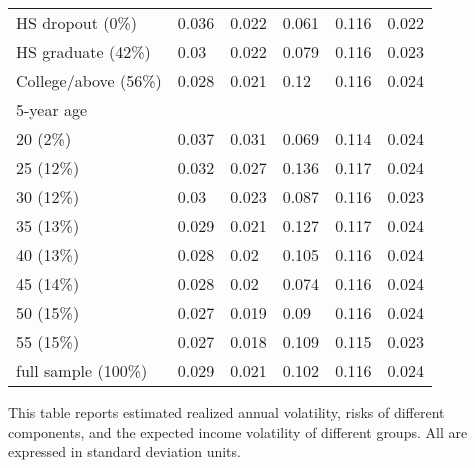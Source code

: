 \begin{table}
{\begin{tabular}{llllll}
HS dropout (0\%)     & 0.036         & 0.022                 & 0.061                   & 0.116         & 0.022        \\
HS graduate (42\%)   & 0.03          & 0.022                 & 0.079                   & 0.116         & 0.023        \\
College/above (56\%) & 0.028         & 0.021                 & 0.12                    & 0.116         & 0.024        \\
\hline 
5-year age           &               &                       &                         &               &              \\
\hline  
20 (2\%)             & 0.037         & 0.031                 & 0.069                   & 0.114         & 0.024        \\
25 (12\%)            & 0.032         & 0.027                 & 0.136                   & 0.117         & 0.024        \\
30 (12\%)            & 0.03          & 0.023                 & 0.087                   & 0.116         & 0.023        \\
35 (13\%)            & 0.029         & 0.021                 & 0.127                   & 0.117         & 0.024        \\
40 (13\%)            & 0.028         & 0.02                  & 0.105                   & 0.116         & 0.024        \\
45 (14\%)            & 0.028         & 0.02                  & 0.074                   & 0.116         & 0.024        \\
50 (15\%)            & 0.027         & 0.019                 & 0.09                    & 0.116         & 0.024        \\
55 (15\%)            & 0.027         & 0.018                 & 0.109                   & 0.115         & 0.023        \\
\hline 
full sample (100\%)  & 0.029         & 0.021                 & 0.102                   & 0.116         & 0.024        \\
\hline 
\hline 
\end{tabular}
}
	\begin{flushleft} This table reports estimated realized annual volatility, risks of different components, and the expected income volatility of different groups. All are expressed in standard deviation units.\end{flushleft}
\end{table}


